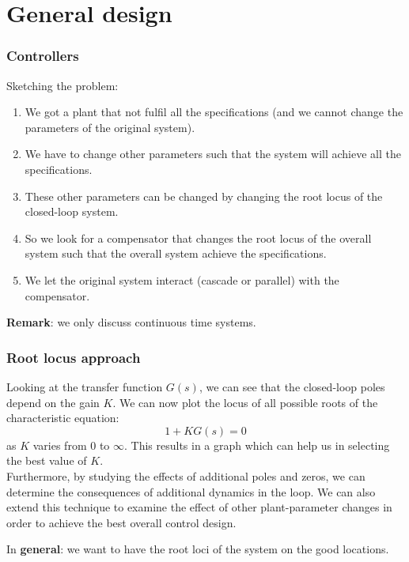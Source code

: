 \section{General design}

\begin{frame}
	\frametitle{Controllers}
		Sketching the problem:
		\begin{enumerate}
			\item We got a plant that not fulfil all the specifications (and we cannot change the parameters of the original system).
			\item We have to change other parameters such that the system will achieve all the specifications.
			\item These other parameters can be changed by changing the root locus of the closed-loop system. 
			\item So we look for a compensator that changes the root locus of the overall system such that the overall system achieve the specifications. 
			\item We let the original system interact (cascade or parallel) with the compensator.
		\end{enumerate}
		\vspace{3mm}
		
		\textbf{Remark}: we only discuss continuous time systems. 
\end{frame}

\begin{frame}
	\frametitle{Root locus approach}
	Looking at the transfer function $G(s)$, we can see that the closed-loop poles depend on the gain $K$. We can now plot the locus of all possible roots of the characteristic equation: 
		$$1 + KG(s) = 0 $$
	as $K$ varies from $0$ to $\infty$. This results in a graph which can help us in selecting the best value of $K$.\\
	\vspace{1em}
	Furthermore, by studying the effects of additional poles and zeros, we can determine the consequences of additional dynamics in the loop. We can also extend this technique to examine the effect of other plant-parameter changes in order to achieve the best overall control design.
	\vspace{2mm}
	
	In \textbf{general}: we want to have the root loci of the system on the good locations.
\end{frame}

